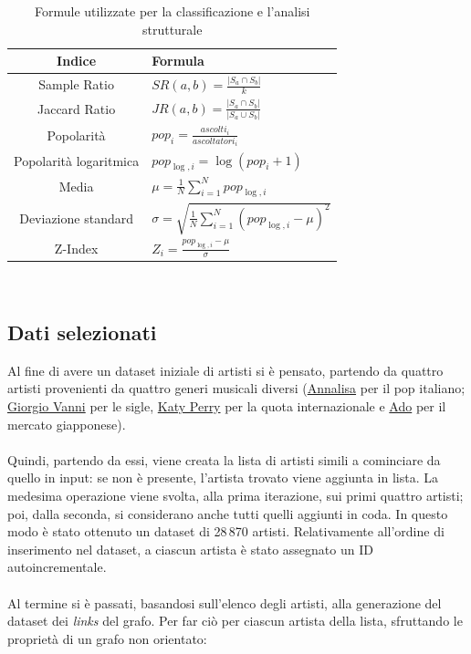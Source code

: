 \documentclass[sigchi]{acmart}
\begin{document}
\begin{table}[H]
\centering
\begin{tabular}{|c|>{\raggedright\arraybackslash}p{4cm}|}
\hline
\textbf{Indice} & \textbf{Formula} \\
\hline
Sample Ratio &
$SR(a, b) = \frac{|S_a \cap S_b|}{k}$ \\
\hline
Jaccard Ratio &
$JR(a, b) = \frac{|S_a \cap S_b|}{|S_a \cup S_b|}$ \\
\hline
Popolarità &
$pop_i = \frac{ascolti_i}{ascoltatori_i}$ \\
\hline
Popolarità logaritmica &
$pop_{\log,i} = \log(pop_i + 1)$ \\
\hline
Media &
$\mu = \frac{1}{N} \sum_{i=1}^{N} pop_{\log,i}$ \\
\hline
Deviazione standard &
$\sigma = \sqrt{\frac{1}{N} \sum_{i=1}^{N} (pop_{\log,i} - \mu)^2}$ \\
\hline
Z-Index &
$Z_i = \frac{pop_{\log,i} - \mu}{\sigma}$ \\
\hline
\end{tabular}\\[15pt]
\caption{Formule utilizzate per la classificazione e l'analisi strutturale}
\end{table}


\subsection{Dati selezionati}

Al fine di avere un dataset iniziale di artisti si è pensato, partendo da quattro artisti provenienti da quattro generi musicali diversi (\href{https://www.last.fm/music/Annalisa}{Annalisa} per il pop italiano; \href{https://www.last.fm/music/Giorgio+Vanni}{Giorgio Vanni} per le sigle, \href{https://www.last.fm/music/Katy+Perry}{Katy Perry} per la quota internazionale e \href{https://www.last.fm/music/Ado}{Ado} per il mercato giapponese). \\ \\ Quindi, partendo da essi, viene creata la lista di artisti simili a cominciare da quello in input: se non è presente, l'artista trovato viene aggiunta in lista. La medesima operazione viene svolta, alla prima iterazione, sui primi quattro artisti; poi, dalla seconda, si considerano anche tutti quelli aggiunti in coda. In questo modo è stato ottenuto un dataset di 28\,870 artisti. Relativamente all'ordine di inserimento nel dataset, a ciascun artista è stato assegnato un ID autoincrementale. \\ \\ Al termine si è passati, basandosi sull'elenco degli artisti, alla generazione del dataset dei {\itshape links} del grafo. Per far ciò per ciascun artista della lista, sfruttando le proprietà di un grafo non orientato:
\end{document}
